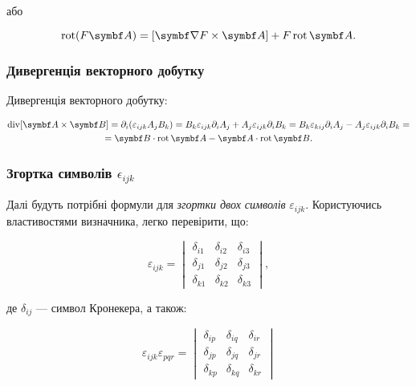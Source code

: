 або

\begin{equation*}
\Rot(F \vect{A}) = [\grad F \times \vect{A}] + F \Rot \vect{A}.
\end{equation*}

\subsubsection{Дивергенція векторного добутку}

Дивергенція векторного добутку:

\begin{multline*}
\Div[\vect{A} \times \vect{B}] = \partial_i (\varepsilon_{ijk} A_j B_k) = B_k \varepsilon_{ijk} \partial_i A_j + A_j \varepsilon_{ijk} \partial_i B_k =
B_k \varepsilon_{kij} \partial_i A_j - A_j \varepsilon_{ijk} \partial_i B_k = \\ = \vect{B} \cdot \Rot \vect{A} - \vect{A} \cdot \Rot \vect{B}.
\end{multline*}

\subsubsection{Згортка символів \texorpdfstring{\(\epsilon_{ijk}\)}{}}

Далі будуть потрібні формули для \emph{згортки двох символів} \(\varepsilon_{ijk}\). Користуючись властивостями визначника, легко перевірити, що:

\begin{equation*}
\varepsilon_{ijk} =
\begin{vmatrix}
\delta_{i1} & \delta_{i2} & \delta_{i3} \\
\delta_{j1} & \delta_{j2} & \delta_{j3} \\
\delta_{k1} & \delta_{k2} & \delta_{k3}
\end{vmatrix},
\end{equation*}

де \(\delta_{ij}\) --- символ Кронекера, а також:

\begin{equation*}
\varepsilon_{ijk} \varepsilon_{pqr} =
\begin{vmatrix}
\delta_{ip} & \delta_{iq} & \delta_{ir} \\
\delta_{jp} & \delta_{jq} & \delta_{jr} \\
\delta_{kp} & \delta_{kq} & \delta_{kr}
\end{vmatrix}
\end{equation*}

